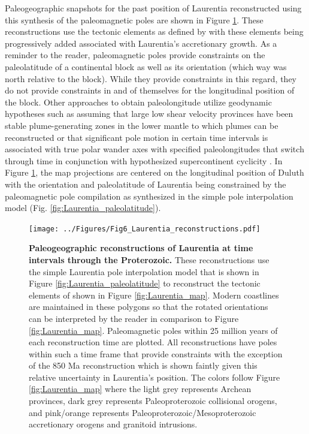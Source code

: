 \documentclass[twocolumn, switch]{article} %
\begin{document}
Paleogeographic snapshots for the past position of Laurentia reconstructed using this synthesis of the paleomagnetic poles are shown in Figure \ref{fig:Laurentia_reconstructions}. These reconstructions use the tectonic elements as defined by \citet{Whitmeyer2007a} with these elements being progressively added associated with Laurentia's accretionary growth. As a reminder to the reader, paleomagnetic poles provide constraints on the paleolatitude of a continental block as well as its orientation (which way was north relative to the block). While they provide constraints in this regard, they do not provide constraints in and of themselves for the longitudinal position of the block. Other approaches to obtain paleolongitude utilize geodynamic hypotheses such as assuming that large low shear velocity provinces have been stable plume-generating zones in the lower mantle to which plumes can be reconstructed \citep{Torsvik2014a} or that significant pole motion in certain time intervals is associated with true polar wander axes with specified paleolongitudes that switch through time in conjunction with hypothesized supercontinent cyclicity \citep{Mitchell2012a}. In Figure \ref{fig:Laurentia_reconstructions}, the map projections are centered on the longitudinal position of Duluth with the orientation and paleolatitude of Laurentia being constrained by the paleomagnetic pole compilation as synthesized in the simple pole interpolation model (Fig. \ref{fig:Laurentia_paleolatitude}).

\begin{figure}
\centering
\texttt{[image: ../Figures/Fig6\_Laurentia\_reconstructions.pdf]}
\caption{\textbf{Paleogeographic reconstructions of Laurentia at time intervals through the Proterozoic.} These reconstructions use the simple Laurentia pole interpolation model that is shown in Figure \ref{fig:Laurentia_paleolatitude} to reconstruct the tectonic elements of \cite{Whitmeyer2007a} shown in Figure \ref{fig:Laurentia_map}. Modern coastlines are maintained in these polygons so that the rotated orientations can be interpreted by the reader in comparison to Figure \ref{fig:Laurentia_map}. Paleomagnetic poles within 25 million years of each reconstruction time are plotted. All reconstructions have poles within such a time frame that provide constraints with the exception of the 850 Ma reconstruction which is shown faintly given this relative uncertainty in Laurentia's position. The colors follow Figure \ref{fig:Laurentia_map} where the light grey represents Archean provinces, dark grey represents Paleoproterozoic collisional orogens, and pink/orange represents Paleoproterozoic/Mesoproterozoic accretionary orogens and granitoid intrusions.}
\label{fig:Laurentia_reconstructions}
\end{figure}
\end{document}
